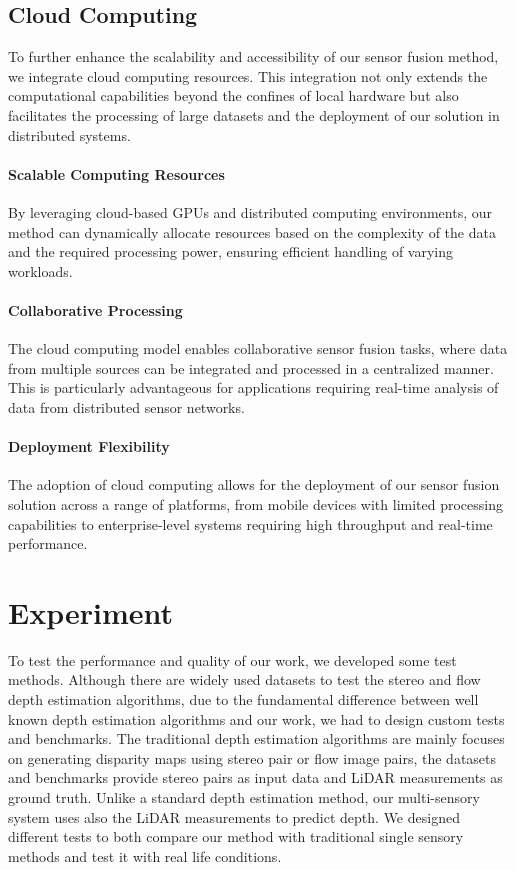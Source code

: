 \documentclass[conference]{IEEEtran}
\begin{document}
\subsection{Cloud Computing}

To further enhance the scalability and accessibility of our sensor fusion method, we integrate cloud computing resources. This integration not only extends the computational capabilities beyond the confines of local hardware but also facilitates the processing of large datasets and the deployment of our solution in distributed systems.

\paragraph{Scalable Computing Resources} By leveraging cloud-based GPUs and distributed computing environments, our method can dynamically allocate resources based on the complexity of the data and the required processing power, ensuring efficient handling of varying workloads.

\paragraph{Collaborative Processing} The cloud computing model enables collaborative sensor fusion tasks, where data from multiple sources can be integrated and processed in a centralized manner. This is particularly advantageous for applications requiring real-time analysis of data from distributed sensor networks.

\paragraph{Deployment Flexibility} The adoption of cloud computing allows for the deployment of our sensor fusion solution across a range of platforms, from mobile devices with limited processing capabilities to enterprise-level systems requiring high throughput and real-time performance.

\section{Experiment}
To test the performance and quality of our work, we developed some test methods. Although there are widely used datasets to test the stereo and flow depth estimation algorithms, due to the fundamental difference between well known depth estimation algorithms and our work, we had to design custom tests and benchmarks.
The traditional depth estimation algorithms are mainly focuses on generating disparity maps using stereo pair or flow image pairs, the datasets and benchmarks provide stereo pairs as input data and LiDAR measurements as ground truth. Unlike a standard depth estimation method, our multi-sensory system uses also the LiDAR measurements to predict depth.
We designed different tests to both compare our method with traditional single sensory methods and test it with real life conditions.
\end{document}
